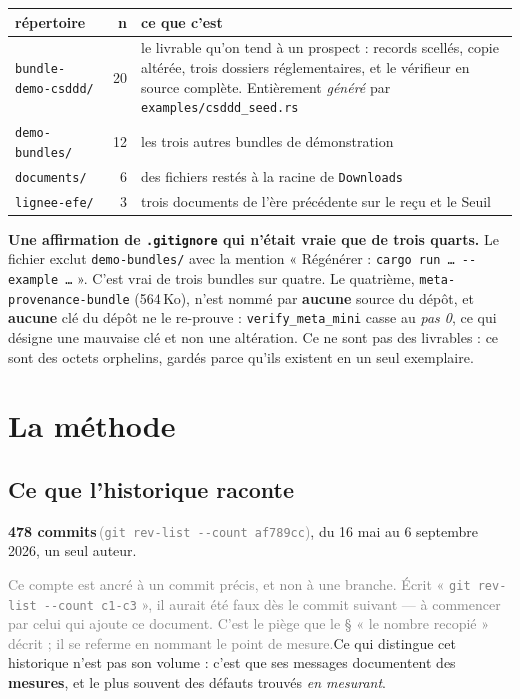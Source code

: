 \documentclass[10pt]{report}
\newcommand{\code}[1]{\texttt{\small #1}}
\newcommand{\att}[1]{\textcolor{amber}{\textbf{#1}}}
\newcommand{\mesure}[2]{\textbf{#1}\,\footnotesize\textcolor{grey}{(#2)}\normalsize}
\begin{document}
\begin{longtable}{@{}p{4.4cm}r p{9.4cm}@{}}
\toprule \textbf{répertoire} & \textbf{n} & \textbf{ce que c'est} \\ \midrule \endhead
\code{bundle-demo-csddd/} & 20 & le livrable qu'on tend à un prospect : records scellés, copie altérée, trois dossiers réglementaires, et le vérifieur en source complète. Entièrement \emph{généré} par \code{examples/csddd\_seed.rs} \\
\code{demo-bundles/} & 12 & les trois autres bundles de démonstration \\
\code{documents/} & 6 & des fichiers restés à la racine de \code{Downloads} \\
\code{lignee-efe/} & 3 & trois documents de l'ère précédente sur le reçu et le Seuil \\
\bottomrule
\end{longtable}

\att{Une affirmation de \code{.gitignore} qui n'était vraie que de trois quarts.} Le fichier exclut
\code{demo-bundles/} avec la mention « Régénérer : \code{cargo run … -{}-example …} ». C'est vrai de
trois bundles sur quatre. Le quatrième, \code{meta-provenance-bundle} (564\,Ko), n'est nommé par
\textbf{aucune} source du dépôt, et \textbf{aucune} clé du dépôt ne le re-prouve : \code{verify\_meta\_mini}
casse au \emph{pas 0}, ce qui désigne une mauvaise clé et non une altération. Ce ne sont pas des
livrables : ce sont des octets orphelins, gardés parce qu'ils existent en un seul exemplaire.


\chapter{La méthode}

\section{Ce que l'historique raconte}

\mesure{478 commits}{\code{git rev-list -{}-count af789cc}}, du 16 mai au 6 septembre 2026, un
seul auteur.

\footnotesize\textcolor{grey}{Ce compte est ancré à un commit précis, et non à une branche. Écrit
« \code{git rev-list -{}-count c1-c3} », il aurait été faux dès le commit suivant --- à commencer par
celui qui ajoute ce document. C'est le piège que le § « le nombre recopié » décrit ; il se referme
en nommant le point de mesure.}\normalsize Ce qui distingue cet historique n'est pas son volume : c'est que ses messages documentent des
\textbf{mesures}, et le plus souvent des défauts trouvés \emph{en mesurant}.
\end{document}
